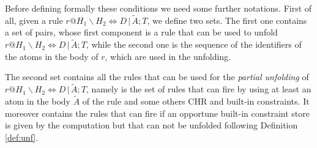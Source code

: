 \documentclass[final]{acmtrans2e}
\begin{document}
Before defining formally these conditions we need some further
notations. First of all, given a rule
$r@H_1\backslash H_2 \Leftrightarrow D\,|\,\tilde A; T$, we define
two sets. The first one contains a set of pairs, whose first
component is a rule that can be used to unfold $r@H_1\backslash
H_2 \Leftrightarrow  D\,|\,\tilde A; T$, while the second one is the
sequence of the identifiers of the atoms in the body of $r$, which
are used in the unfolding.

The second set contains all the rules that can be used for the
{\em partial unfolding} of $r@H_1\backslash H_2 \Leftrightarrow
D\,|\,\tilde A; T$, namely is the set of rules that can fire by
using at least an atom in the body $\tilde A$ of the rule and
some others CHR and built-in constraints. It moreover contains
the rules that can fire if an opportune built-in constraint
store is given by the computation but that can not be unfolded
following Definition \ref{def:unf}.
\end{document}
